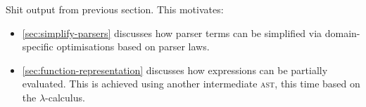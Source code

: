 \documentclass[../../main.tex]{subfiles}
\begin{document}
Shit output from previous section. This motivates:
\begin{itemize}
  \item \cref{sec:simplify-parsers} discusses how parser terms can be simplified via domain-specific optimisations based on parser laws.
  \item \cref{sec:function-representation} discusses how expressions can be partially evaluated. This is achieved using another intermediate \textsc{ast}, this time based on the $\lambda$-calculus.
\end{itemize}





\end{document}
